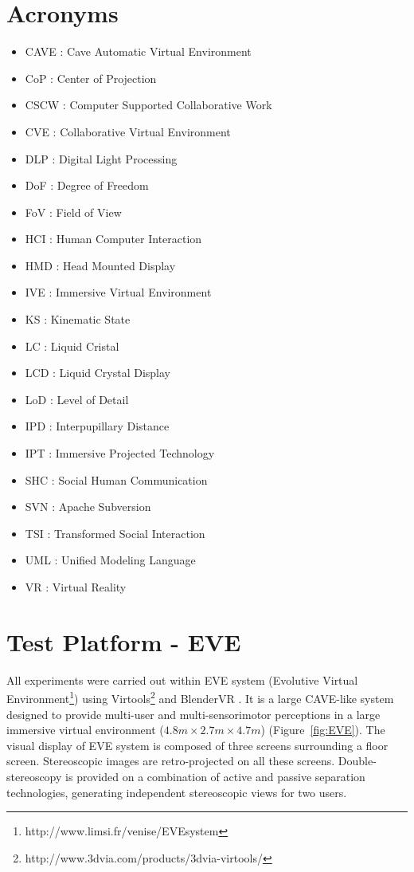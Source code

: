 \begin{appendices}
\appendixpage
\noappendicestocpagenum
\addappheadtotoc

\chapter{Acronyms}
\label{appendix:acronyms}
\begin{multicols}{2}
\begin{itemize}
  \item CAVE : Cave Automatic Virtual Environment
  \item CoP : Center of Projection
  \item CSCW : Computer Supported Collaborative Work
  \item CVE : Collaborative Virtual Environment
  \item DLP : Digital Light Processing
  \item DoF : Degree of Freedom
  \item FoV : Field of View
  \item HCI : Human Computer Interaction
  \item HMD : Head Mounted Display
  \item IVE : Immersive Virtual Environment
  \item KS  : Kinematic State
  \item LC  : Liquid Cristal
  \item LCD : Liquid Crystal Display
  \item LoD : Level of Detail
  \item IPD : Interpupillary Distance
  \item IPT : Immersive Projected Technology
  \item SHC : Social Human Communication
  \item SVN : Apache Subversion
  \item TSI : Transformed Social Interaction
  \item UML : Unified Modeling Language
  \item VR  : Virtual Reality
\end{itemize}
\end{multicols}

\chapter{Test Platform - EVE}
\label{appendix:platform}
All experiments were carried out within EVE system (Evolutive Virtual Environment\footnote{http://www.limsi.fr/venise/EVEsystem}) using Virtools\footnote{http://www.3dvia.com/products/3dvia-virtools/} and BlenderVR \citep{BlenderVR2015}. It is a large CAVE-like system designed to provide multi-user and multi-sensorimotor perceptions in a large immersive virtual environment ($4.8m\times2.7m\times4.7m$) (Figure~\ref{fig:EVE}). The visual display of EVE system is composed of three screens surrounding a floor screen. Stereoscopic images are retro-projected on all these screens. Double-stereoscopy is provided on a combination of active and passive separation technologies, generating independent stereoscopic views for two users.


\end{appendices}
